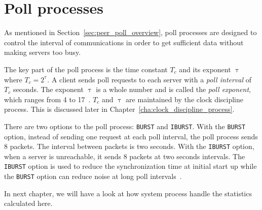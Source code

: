 \section{Poll processes}%
\label{sec:poll_processes}
As mentioned in Section~\ref{sec:peer_poll_overview}, poll processes are
designed to control the interval of communications in order to get sufficient
data without making servers too busy. 

The key part of the poll process is the time constant $T_c$ and its
exponent $\uptau$ where $T_c = 2 ^ {\uptau}$. A client sends poll requests to
each server with a \emph{poll interval} of $T_c$ seconds. The exponent $\uptau$
is a whole number and is called the \emph{poll exponent}, which ranges from 4
to 17~\cite{rfc5905}.  
$T_c$ and $\uptau$ are maintained by the clock discipline process. This is
discussed later in Chapter~\ref{cha:clock_discipline_process}.

There are two options to the poll process: \verb|BURST| and \verb|IBURST|\null.
With the \verb|BURST| option, instead of sending one request at each poll
interval, the poll process sends 8 packets. The interval between packets is two
seconds.  With the \verb|IBURST| option, when a server is unreachable, it sends
8 packets at two seconds intervals. The \verb|IBURST| option is used to reduce
the synchronization time at initial start up while the \verb|BURST| option can
reduce noise at long poll intervals~\cite{poll_process}.

In next chapter, we will have a look at how system process handle the
statistics calculated here.
